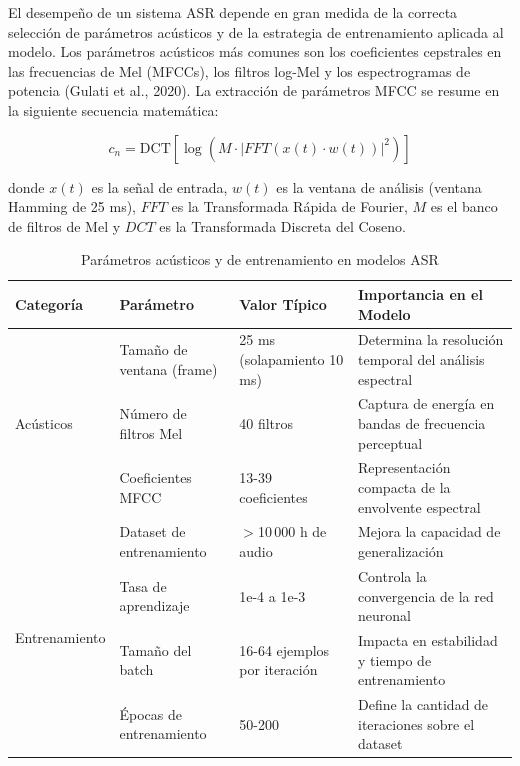 \documentclass[12pt,a4paper,oneside]{report}
\begin{document}
El desempeño de un sistema ASR depende en gran medida de la correcta selección de parámetros acústicos y de la estrategia de entrenamiento aplicada al modelo. Los parámetros acústicos más comunes son los coeficientes cepstrales en las frecuencias de Mel (MFCCs), los filtros log-Mel y los espectrogramas de potencia (Gulati et al., 2020). La extracción de parámetros MFCC se resume en la siguiente secuencia matemática:

\begin{equation}
c_n = \text{DCT}\left[\log\left(M \cdot |FFT(x(t) \cdot w(t))|^2\right)\right]
\end{equation}

donde $x(t)$ es la señal de entrada, $w(t)$ es la ventana de análisis (ventana Hamming de 25 ms), $FFT$ es la Transformada Rápida de Fourier, $M$ es el banco de filtros de Mel y $DCT$ es la Transformada Discreta del Coseno.

\begin{table}[H]
\centering
\caption{Parámetros acústicos y de entrenamiento en modelos ASR}
\begin{tabular}{|p{2.5cm}|p{3.5cm}|p{2.5cm}|p{3.5cm}|}
\hline
\rowcolor{gray!20}
\textbf{Categoría} & \textbf{Parámetro} & \textbf{Valor Típico} & \textbf{Importancia en el Modelo} \\
\hline
\multirow{3}{2.5cm}{Acústicos} & Tamaño de ventana (frame) & 25 ms (solapamiento 10 ms) & Determina la resolución temporal del análisis espectral \\
\cline{2-4}
& Número de filtros Mel & 40 filtros & Captura de energía en bandas de frecuencia perceptual \\
\cline{2-4}
& Coeficientes MFCC & 13-39 coeficientes & Representación compacta de la envolvente espectral \\
\hline
\multirow{4}{2.5cm}{Entrenamiento} & Dataset de entrenamiento & $>$10\,000 h de audio & Mejora la capacidad de generalización \\
\cline{2-4}
& Tasa de aprendizaje & 1e-4 a 1e-3 & Controla la convergencia de la red neuronal \\
\cline{2-4}
& Tamaño del batch & 16-64 ejemplos por iteración & Impacta en estabilidad y tiempo de entrenamiento \\
\cline{2-4}
& Épocas de entrenamiento & 50-200 & Define la cantidad de iteraciones sobre el dataset \\
\hline
\end{tabular}
\label{tab:parametros}
\end{table}
\end{document}
